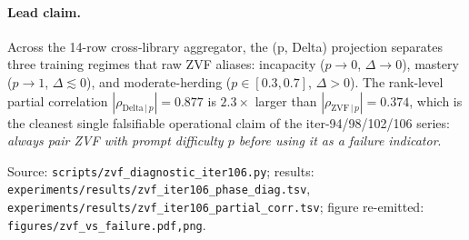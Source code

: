 \paragraph{Lead claim.}
Across the 14-row cross-library aggregator, the (p, Delta) projection
separates three training regimes that raw ZVF aliases: incapacity
($p\to 0$, $\Delta\to 0$), mastery ($p\to 1$, $\Delta\lesssim 0$),
and moderate-herding ($p\!\in\![0.3,0.7]$, $\Delta>0$). The rank-level
partial correlation $|\rho_{\mathrm{Delta}\,|\,p}|=0.877$ is
$2.3\times$ larger than $|\rho_{\mathrm{ZVF}\,|\,p}|=0.374$, which is
the cleanest single falsifiable operational claim of the
iter-94/98/102/106 series: \emph{always pair ZVF with prompt difficulty
$p$ before using it as a failure indicator}.

Source: \texttt{scripts/zvf\_diagnostic\_iter106.py};
results: \texttt{experiments/results/zvf\_iter106\_phase\_diag.tsv},
\texttt{experiments/results/zvf\_iter106\_partial\_corr.tsv};
figure re-emitted: \texttt{figures/zvf\_vs\_failure.{pdf,png}}.